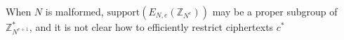 \documentclass[11pt]{article}
\newcommand{\encdj}{{E}_{N,e}}
\newcommand{\Z}{\mathbb{Z}}
\newcommand{\U}[1]{\mathbb{Z}_{#1}^*}
\newcommand{\plain}{{{M}}}
\newcommand{\encr}[2]{E_{#1}(#2)}
\newcommand{\plaintext}[1]{\plain_{#1}}
\newcommand{\fnrngdom}[2]{#1\to#2}
\newcommand{\fndef}[3]{{#1\,:\,\fnrngdom{#2}{#3}}}
\newcommand{\usamp}[2]{#1\stackrel{\footnotesize{\sf R}}{\leftarrow}#2}
\newcommand{\support}{{\mathrm{support}}}
\begin{document}
When $N$ is malformed, $\support(\encdj(\Z_{N^e}))$ may be a proper
subgroup of $\U{N^{e+1}}$,
and it is not clear how to efficiently restrict ciphertexts $c^*$
\end{document}
